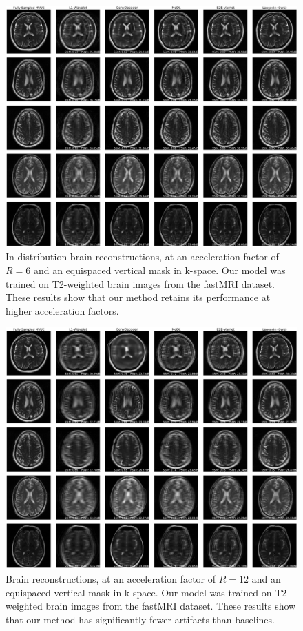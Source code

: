 \documentclass{article}
\begin{document}
\begin{figure}
    \centering
    \includegraphics[width=\columnwidth]{brain-equispaced-vertical-R=6-comp.pdf}
    \caption{ In-distribution brain reconstructions, at an acceleration factor of $R=6$ and an equispaced vertical mask in k-space. Our model was trained on T2-weighted brain images from the fastMRI dataset. These results show that our method retains its performance at higher acceleration factors.}
    \label{fig:brain-in-6}
\end{figure}

\begin{figure}
    \centering
    \includegraphics[width=\columnwidth]{brain-equispaced-vertical-R=12-comp.pdf}
    \caption{Brain reconstructions, at an acceleration factor of $R=12$ and an equispaced vertical mask in k-space. Our model was trained on T2-weighted brain images from the fastMRI dataset. These results show that our method has significantly fewer artifacts than baselines.}
    \label{fig:brain-in-12}
\end{figure}
\end{document}
